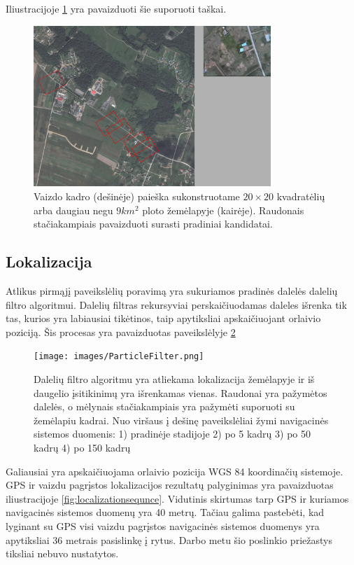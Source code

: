 \documentclass[a4paper,12pt]{article}
\begin{document}
			Iliustracijoje \ref{fig:TemplateMatchingResult} yra pavaizduoti šie suporuoti taškai.
			
			\begin{figure}[H]
				\centering
				\includegraphics[width=0.8\textwidth]{images/TemplateMatch.png}
				\caption{Vaizdo kadro (dešinėje) paieška sukonstruotame $20\times20$ kvadratėlių arba daugiau negu $9 km^2$ ploto žemėlapyje (kairėje). Raudonais stačiakampiais pavaizduoti surasti pradiniai kandidatai.}
				\label{fig:TemplateMatchingResult}
			\end{figure}					
		
		\clearpage
		\subsection{Lokalizacija}
			
			Atlikus pirmąjį paveikslėlių poravimą yra sukuriamos pradinės dalelės dalelių filtro algoritmui. Dalelių filtras rekursyviai perskaičiuodamas daleles išrenka tik tas, kurios yra labiausiai tikėtinos, taip apytiksliai apskaičiuojant orlaivio poziciją. Šis procesas yra pavaizduotas paveikslėlyje \ref{fig:ParticleFilter}
		
			\begin{figure}[h]
				\centering
				\texttt{[image: images/ParticleFilter.png]}
				\caption{Dalelių filtro algoritmu yra atliekama lokalizacija žemėlapyje ir iš daugelio įsitikinimų yra išrenkamas vienas. Raudonai yra pažymėtos dalelės, o mėlynais stačiakampiais yra pažymėti suporuoti su žemėlapiu kadrai. Nuo viršaus į dešinę paveikslėliai žymi navigacinės sistemos duomenis: 1) pradinėje stadijoje 2) po 5 kadrų 3) po 50 kadrų 4) po 150 kadrų}
				\label{fig:ParticleFilter}
			\end{figure}
		
		Galiausiai yra apskaičiuojama orlaivio pozicija WGS 84 koordinačių sistemoje. GPS ir vaizdu pagrįstos lokalizacijos rezultatų palyginimas yra pavaizduotas iliustracijoje \ref{fig:localizationsequnce}. Vidutinis skirtumas tarp GPS ir kuriamos navigacinės sistemos duomenų yra 40 metrų. Tačiau galima pastebėti, kad lyginant su GPS visi vaizdu pagrįstos navigacinės sistemos duomenys yra apytiksliai 36 metrais pasislinkę į rytus. Darbo metu šio poslinkio priežastys tiksliai nebuvo nustatytos. 
		
\end{document}
